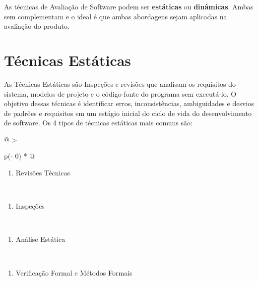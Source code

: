 \documentclass[
]{book}
\providecommand{\tightlist}{%
  \setlength{\itemsep}{0pt}\setlength{\parskip}{0pt}}
\begin{document}
As técnicas de Avaliação de Software podem ser \textbf{estáticas} ou \textbf{dinâmicas}. Ambas sem complementam e o ideal é que ambas abordagens sejam aplicadas na avaliação do produto.

\section{Técnicas Estáticas}\label{tuxe9cnicas-estuxe1ticas}

As Técnicas Estáticas são Inspeções e revisões que analisam os requisitos do sistema, modelos de projeto e o código-fonte do programa sem executá-lo. O objetivo dessas técnicas é identificar erros, inconsistências, ambiguidades e desvios de padrões e requisitos em um estágio inicial do ciclo de vida do desenvolvimento de software. Os 4 tipos de técnicas estáticas mais comuns são:

\begin{longtable}[]{@{}
  >{\raggedright\arraybackslash}p{(\columnwidth - 0\tabcolsep) * }@{}}
\caption{Os tipos de TÉCNICAS ESTÁTICAS}\tabularnewline
\toprule\noalign{}
\endfirsthead
\endhead
\bottomrule\noalign{}
\endlastfoot
\begin{minipage}[t]{\linewidth}\raggedright
\begin{enumerate}
\def\labelenumi{\alph{enumi})}
\tightlist
\item
  Revisões Técnicas
\end{enumerate}
\end{minipage} \\
\begin{minipage}[t]{\linewidth}\raggedright
\begin{enumerate}
\def\labelenumi{\alph{enumi})}
\setcounter{enumi}{1}
\tightlist
\item
  Inspeções
\end{enumerate}
\end{minipage} \\
\begin{minipage}[t]{\linewidth}\raggedright
\begin{enumerate}
\def\labelenumi{\alph{enumi})}
\setcounter{enumi}{2}
\tightlist
\item
  Análise Estática
\end{enumerate}
\end{minipage} \\
\begin{minipage}[t]{\linewidth}\raggedright
\begin{enumerate}
\def\labelenumi{\alph{enumi})}
\setcounter{enumi}{3}
\tightlist
\item
  Verificação Formal e Métodos Formais
\end{enumerate}
\end{minipage} \\
\end{longtable}
\end{document}
